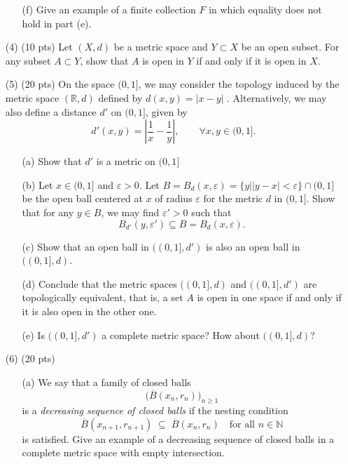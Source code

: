 \documentclass[12pt]{amsart}
\theoremstyle{definition}
\theoremstyle{remark}
\begin{document}
\begin{CJK}{UTF8}{bkai}
\begin{enumerate}
\begin{enumerate}
  \item[(f)] Give an example of a finite collection $F$ in which equality does not hold in part \textup{(e)}.
\end{enumerate}

\vfill
\bigskip

\item[(4)]  (10 pts) Let $(X, d)$ be a metric space and $Y \subset X$ be an open subset. For any subset $A \subset Y$, show
that $A$ is open in $Y$ if and only if it is open in $X$.
 
\vfill
\bigskip

\item[(5)]  (20 pts) On the space $(0,1]$, we may consider the topology induced by the metric space $(\mathbb{R},d)$ defined by
$d(x,y)=|x-y|$ . Alternatively, we may also define a distance $d'$ on $(0,1]$, given by
\[
d'(x,y) = \left| \frac{1}{x} - \frac{1}{y} \right|, \qquad \forall x,y \in (0,1].
\]

\begin{enumerate}
 \item[(a)] Show that $d'$ is a metric on $(0,1]$
 \item[(b)] Let $x \in (0,1]$ and $\varepsilon>0$. Let $B = B_{d}(x,\varepsilon)=\{y | |y-x| < \varepsilon \} \cap (0,1]$  be the open ball centered at $x$ of radius $\varepsilon$ for the metric $d$ in $(0,1]$.  
  Show that for any $y \in B$, we may find $\varepsilon'>0$ such that
  \[
  B_{d'}(y,\varepsilon') \subseteq B = B_{d}(x,\varepsilon).
  \]

 \item[(c)]Show that an open ball in $((0,1],d')$ is also an open ball in $((0,1],d)$.

 \item[(d)] Conclude that the metric spaces $((0,1],d)$ and $((0,1],d')$ are topologically equivalent, that is, a set $A$ is open in one space if and only if it is also open in the other one.

 \item[(e)] Is $((0,1],d')$ a complete metric space? How about $((0,1],d)$?
\end{enumerate}



\bigskip

\item[(6)]  (20 pts) 
\begin{enumerate}

  \item[(a)] 
  We say that a family of closed balls 
\[
\bigl(\overline{B}(x_n,r_n)\bigr)_{n\ge 1}
\]
is a \emph{decreasing sequence of closed balls} if 
the nesting condition
\[
\overline{B}(x_{n+1},r_{n+1}) \;\subseteq\; \overline{B}(x_n,r_n)
\quad\text{for all } n\in\mathbb{N}
\]
is satisfied. Give an example of a decreasing sequence of closed balls in a complete metric space with empty intersection. 


\end{enumerate}
\end{enumerate}
\end{CJK}
\end{document}
